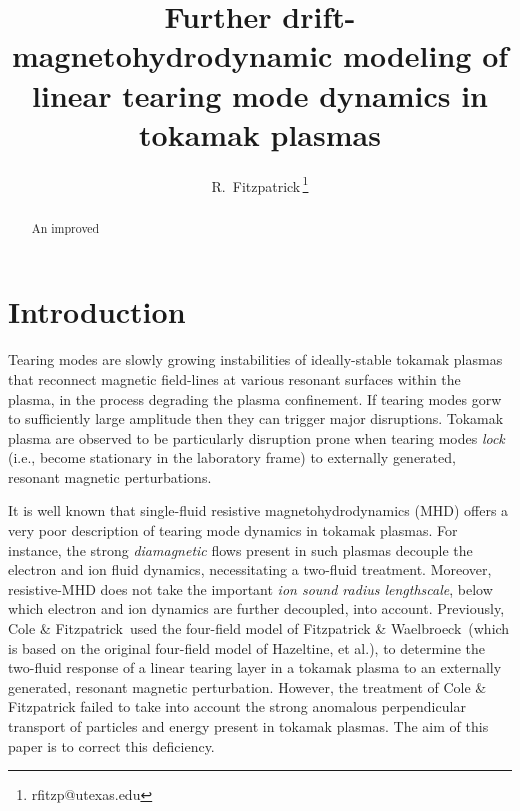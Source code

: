 \documentclass[12pt,prb,aps]{revtex4-1}
\begin{document}
\title{Further drift-magnetohydrodynamic modeling of linear tearing mode dynamics in tokamak plasmas}

\author{R.~Fitzpatrick\,\footnote{rfitzp@utexas.edu}}

\begin{abstract}
An improved 
\end{abstract}

\maketitle

\section{Introduction}
Tearing modes are slowly growing instabilities of ideally-stable tokamak plasmas that reconnect magnetic field-lines
at various resonant surfaces within the plasma, in the process degrading the plasma confinement.\cite{wes}
If tearing modes gorw to sufficiently large amplitude then they can trigger major disruptions.\cite{wes1}  Tokamak
plasma are observed to be particularly disruption prone when tearing modes {\em lock}\/ (i.e., become stationary in the
laboratory frame) to externally generated, resonant magnetic perturbations.\cite{vries}  

It is well known that single-fluid resistive magnetohydrodynamics (MHD) offers a very poor description of
tearing mode dynamics in tokamak plasmas. 
For instance, the strong {\em diamagnetic}\/ flows present in such plasmas decouple the electron and ion fluid dynamics,
necessitating a two-fluid treatment.\cite{ara} Moreover, resistive-MHD does not take  the important {\em ion sound radius lengthscale}, below which electron and ion dynamics are further decoupled, 
into account.\cite{drake,wal} Previously, Cole \& Fitzpatrick\,\cite{cole} used the four-field model
of Fitzpatrick \& Waelbroeck\,\cite{fw} (which is based on the original four-field model of Hazeltine, et al.\cite{haz}),
to determine the two-fluid response of a linear tearing layer in a tokamak plasma to an externally generated, 
resonant magnetic perturbation. However, the treatment of Cole \& Fitzpatrick failed to take into account the
strong anomalous perpendicular transport of particles and energy present in tokamak plasmas. The
aim of this paper is to correct this deficiency. 
\end{document}
